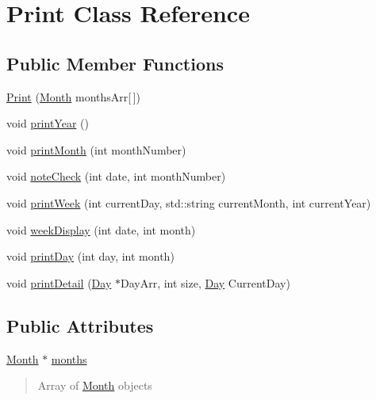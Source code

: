 \hypertarget{class_print}{}\section{Print Class Reference}
\label{class_print}
\subsection*{Public Member Functions}
\begin{DoxyCompactItemize}
\item 
\hyperlink{class_print_a7b9e4716438a4d6003fb53d740172463}{Print} (\hyperlink{class_month}{Month} months\+Arr\mbox{[}$\,$\mbox{]})
\item 
void \hyperlink{class_print_ab38ff940d0abba39ec72485ba3e16259}{print\+Year} ()
\item 
void \hyperlink{class_print_a783042d8e22a1b8a0b81bbcbc9bb03f0}{print\+Month} (int month\+Number)
\item 
void \hyperlink{class_print_ae528ed0fc9fe31222a1fcd33fe58d45b}{note\+Check} (int date, int month\+Number)
\item 
void \hyperlink{class_print_a5480160313e90ae75d51255bd20a54fe}{print\+Week} (int current\+Day, std\+::string current\+Month, int current\+Year)
\item 
void \hyperlink{class_print_a7013b300e4a36e6cd2fa8c68eab71892}{week\+Display} (int date, int month)
\item 
void \hyperlink{class_print_adcc0b985904ceb75634e3bb0b156d033}{print\+Day} (int day, int month)
\item 
void \hyperlink{class_print_a885ba5ae8549695d781bb03c8a3f2109}{print\+Detail} (\hyperlink{class_day}{Day} $\ast$Day\+Arr, int size, \hyperlink{class_day}{Day} Current\+Day)
\end{DoxyCompactItemize}
\subsection*{Public Attributes}
\begin{DoxyCompactItemize}
\item 
\hyperlink{class_month}{Month} $\ast$ \hyperlink{class_print_a9c8bb58b547f6ffd71b735b6bb0072b1}{months}\hypertarget{class_print_a9c8bb58b547f6ffd71b735b6bb0072b1}{}\label{class_print_a9c8bb58b547f6ffd71b735b6bb0072b1}

\begin{DoxyCompactList}\small\item\em \begin{quote}
Array of \hyperlink{class_month}{Month} objects \end{quote}
\end{DoxyCompactList}\end{DoxyCompactItemize}


